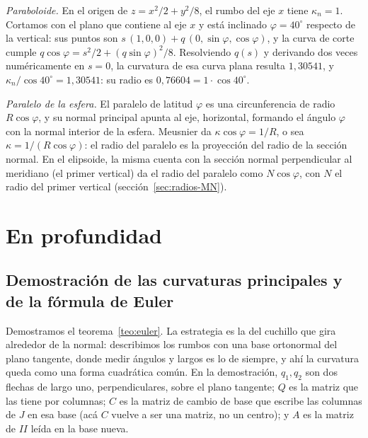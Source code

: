 \begin{ejemplo}\label{ej:curv-meusnier}
\emph{Paraboloide.} En el origen de \(z=x^2/2+y^2/8\), el rumbo del eje \(x\) tiene
\(\kappa_n=1\). Cortamos con el plano que contiene al eje \(x\) y está inclinado
\(\varphi=40^\circ\) respecto de la vertical: sus puntos son \(s\,(1,0,0)+q\,(0,\sin\varphi,\cos\varphi)\),
y la curva de corte cumple \(q\cos\varphi=s^2/2+(q\sin\varphi)^2/8\). Resolviendo \(q(s)\)
y derivando dos veces numéricamente en \(s=0\), la curvatura de esa curva plana resulta
\(1{,}30541\), y \(\kappa_n/\cos40^\circ=1{,}30541\): su radio es \(0{,}76604=1\cdot\cos40^\circ\).

\emph{Paralelo de la esfera.} El paralelo de latitud \(\varphi\) es una circunferencia de
radio \(R\cos\varphi\), y su normal principal apunta al eje, horizontal, formando el ángulo
\(\varphi\) con la normal interior de la esfera. Meusnier da
\(\kappa\cos\varphi=1/R\), o sea \(\kappa=1/(R\cos\varphi)\): el radio del paralelo es la
proyección del radio de la sección normal. En el elipsoide, la misma cuenta con la sección
normal perpendicular al meridiano (el primer vertical) da el radio del paralelo como
\(N\cos\varphi\), con \(N\) el radio del primer vertical
(sección~\ref{sec:radios-MN}).
\end{ejemplo}

\section{En profundidad}

\subsection{Demostración de las curvaturas principales y de la fórmula de Euler}\label{sec:curv-demostraciones}

Demostramos el teorema~\ref{teo:euler}. La estrategia es la del cuchillo que gira alrededor de
la normal: describimos los rumbos con una base ortonormal del plano tangente, donde medir
ángulos y largos es lo de siempre, y ahí la curvatura queda como una forma cuadrática común.
En la demostración, \(q_1,q_2\) son dos flechas de largo uno, perpendiculares, sobre el plano
tangente; \(Q\) es la matriz que las tiene por columnas; \(C\) es la matriz de cambio de base
que escribe las columnas de \(J\) en esa base (acá \(C\) vuelve a ser una matriz, no un
centro); y \(A\) es la matriz de \(II\) leída en la base nueva.

